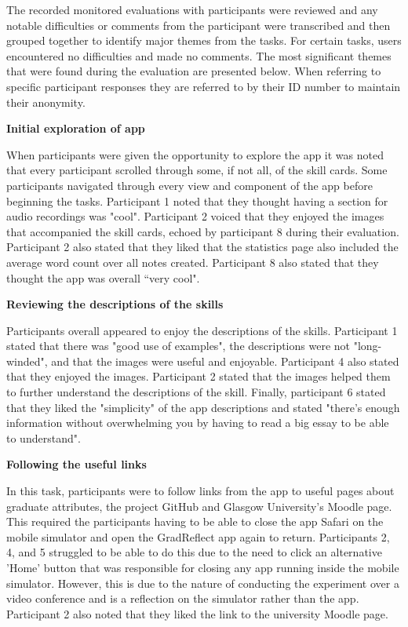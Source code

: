 \documentclass{l4proj}
\begin{document}
The recorded monitored evaluations with participants were reviewed and any notable difficulties or comments from the participant were transcribed and then grouped together to identify major themes from the tasks. For certain tasks, users encountered no difficulties and made no comments. The most significant themes that were found during the evaluation are presented below. When referring to specific participant responses they are referred to by their ID number to maintain their anonymity.

\textbf{Initial exploration of app}

When participants were given the opportunity to explore the app it was noted that every participant scrolled through some, if not all, of the skill cards. Some participants navigated through every view and component of the app before beginning the tasks. Participant 1 noted that they thought having a section for audio recordings was "cool". Participant 2 voiced that they enjoyed the images that accompanied the skill cards, echoed by participant 8 during their evaluation. Participant 2 also stated that they liked that the statistics page also included the average word count over all notes created. Participant 8 also stated that they thought the app was overall “very cool".

\textbf{Reviewing the descriptions of the skills}

Participants overall appeared to enjoy the descriptions of the skills. Participant 1 stated that there was "good use of examples", the descriptions were not "long-winded", and that the images were useful and enjoyable. Participant 4 also stated that they enjoyed the images. Participant 2 stated that the images helped them to further understand the descriptions of the skill. Finally, participant 6 stated that they liked the "simplicity" of the app descriptions and stated "there's enough information without overwhelming you by having to read a big essay to be able to understand".


\textbf{Following the useful links}

In this task, participants were to follow links from the app to useful pages about graduate attributes, the project GitHub and Glasgow University's Moodle page. This required the participants having to be able to close the app Safari on the mobile simulator and open the GradReflect app again to return. Participants 2, 4, and 5 struggled to be able to do this due to the need to click an alternative 'Home' button that was responsible for closing any app running inside the mobile simulator. However, this is due to the nature of conducting the experiment over a video conference and is a reflection on the simulator rather than the app. Participant 2 also noted that they liked the link to the university Moodle page.
\end{document}
